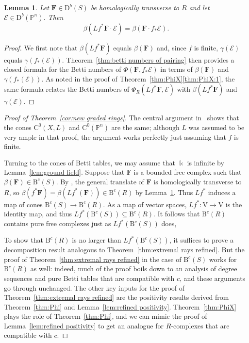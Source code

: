 \documentclass[12pt]{amsart}
\newtheorem{lemma}{Lemma}[section]
\theoremstyle{definition}
\theoremstyle{remark}
\newcommand{\kk}{\Bbbk}
\newcommand{\PP}{\mathbb{P}}
\newcommand{\VV}{\mathrm{V}}
\newcommand{\cc}{c}
\newcommand{\cE}{\mathcal{E}}
\newcommand{\FF}{\mathbf{F}}
\newcommand{\DD}{\mathrm{D}}
\newcommand{\CQ}{\mathrm{C}}
\newcommand{\BBQ}{\mathrm{B}}
\begin{document}
\begin{lemma}\label{lem:general pairing}
Let $\FF\in \DD^b(S)$ be homologically transverse to $R$ and let $\cE\in \DD^b(\PP^n)$.  Then
\[
\beta(Lf^*\FF\cdot \cE)=\beta(\FF\cdot f_*\cE).
\]
\end{lemma}
\begin{proof}
We first note that $\beta(Lf^*\FF)$ equals $\beta(\FF)$ and, since $f$ is finite, $\gamma(\cE)$ equals $\gamma(f_*(\cE))$.  Theorem~\ref{thm:betti numbers of pairing} then provides a closed formula for the Betti numbers of $\Phi(\FF,f_*\cE)$ in terms of $\beta(\FF)$ and $\gamma(f_*(\cE))$.  As noted in the proof of Theorem~\ref{thm:PhiX}\eqref{thm:PhiX:1}, the same formula relates the Betti numbers of $\Phi_{R}(Lf^*\FF,\cE)$ with  $\beta(Lf^*\FF)$ and $\gamma(\cE)$.
\end{proof}

\begin{proof}[Proof of Theorem~\ref{cor:new graded rings}]
The central argument in~\cite[Proof of Theorem 5]{eis-schrey-abel} shows that the cones
$\CQ^0(X,L)$ and $\CQ^{0}(\PP^n)$ are the same;
 although $L$ was assumed to be very ample in that proof, the  argument works perfectly just assuming that $f$ is finite.

Turning to the cones of Betti tables, 
we may assume that $\kk$ is infinite by Lemma~\ref{lem:ground field}. Suppose that $\FF$ is a bounded
free complex such that $\beta(\FF)\in \BBQ^{\cc}(S)$.
By \cite[Theorem, p.\ 335]{miller-speyer}, the general translate of $\FF$ is homologically transverse to $R$,
so $\beta(f^{*}\FF) = \beta(Lf^{*}(\FF))\in \BBQ^{\cc}(R)$ by Lemma~\ref{lem:general pairing}. Thus
$Lf^{*}$ induces a map of cones $\BBQ^{\cc}(S)\to \BBQ^{\cc}(R)$.
As a map of vector spaces, $Lf^*\colon \VV\to \VV$ 
is the identity map, and thus 
$
Lf^*(\BBQ^{\cc}(S))\subseteq \BBQ^{\cc}(R).
$
It follows that $\BBQ^{\cc}(R)$ contains pure free complexes just as $Lf^*(\BBQ^{\cc}(S))$ does,

To show that  $\BBQ^{\cc}(R)$ is no larger than $Lf^*(\BBQ^{\cc}(S))$, it suffices to prove
a decomposition result analogous to Theorem~\ref{thm:extremal rays refined}. But
the proof of Theorem~\ref{thm:extremal rays refined} in the case of $\BBQ^{\cc}(S)$ works for $\BBQ^{\cc}(R)$ as well: indeed, much of the proof boils down to an analysis of degree sequences and pure Betti tables that are compatible with $\cc$, and these arguments go through unchanged.  The other key inputs for the proof of Theorem~\ref{thm:extremal rays refined} are the positivity results derived from Theorem~\ref{thm:Phi} and Lemma~\ref{lem:refined positivity}.  Theorem~\ref{thm:PhiX} plays the role of Theorem~\ref{thm:Phi}, and we can mimic the proof of Lemma~\ref{lem:refined positivity} to get an analogue for $R$-complexes that are compatible with $\cc$.
\end{proof}
\end{document}
